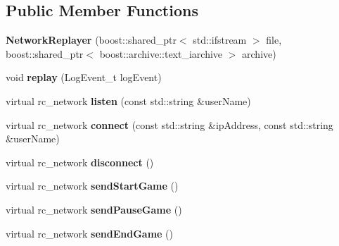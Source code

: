 \subsection*{Public Member Functions}
\begin{DoxyCompactItemize}
\item 
\hypertarget{classNetworkReplayer_ad91a8bed9fc2c9e69163c5290a823fee}{
{\bfseries NetworkReplayer} (boost::shared\_\-ptr$<$ std::ifstream $>$ file, boost::shared\_\-ptr$<$ boost::archive::text\_\-iarchive $>$ archive)}
\label{classNetworkReplayer_ad91a8bed9fc2c9e69163c5290a823fee}

\item 
\hypertarget{classNetworkReplayer_ab4162db2236a7b337bcef679682f8609}{
void {\bfseries replay} (LogEvent\_\-t logEvent)}
\label{classNetworkReplayer_ab4162db2236a7b337bcef679682f8609}

\item 
\hypertarget{classNetworkReplayer_a54f644fe92941370481c45989bad6615}{
virtual rc\_\-network {\bfseries listen} (const std::string \&userName)}
\label{classNetworkReplayer_a54f644fe92941370481c45989bad6615}

\item 
\hypertarget{classNetworkReplayer_a6d4deeeede0cd5c07b44489a33c113f5}{
virtual rc\_\-network {\bfseries connect} (const std::string \&ipAddress, const std::string \&userName)}
\label{classNetworkReplayer_a6d4deeeede0cd5c07b44489a33c113f5}

\item 
\hypertarget{classNetworkReplayer_a3aab774a33a87446aa874871fea54655}{
virtual rc\_\-network {\bfseries disconnect} ()}
\label{classNetworkReplayer_a3aab774a33a87446aa874871fea54655}

\item 
\hypertarget{classNetworkReplayer_aa9f70d4eee3d630c36c2bbc71bb7e195}{
virtual rc\_\-network {\bfseries sendStartGame} ()}
\label{classNetworkReplayer_aa9f70d4eee3d630c36c2bbc71bb7e195}

\item 
\hypertarget{classNetworkReplayer_aa54ba87a728ebdb0f23a82e409094468}{
virtual rc\_\-network {\bfseries sendPauseGame} ()}
\label{classNetworkReplayer_aa54ba87a728ebdb0f23a82e409094468}

\item 
\hypertarget{classNetworkReplayer_a33c840b356485101092fe220d4aa73fb}{
virtual rc\_\-network {\bfseries sendEndGame} ()}
\label{classNetworkReplayer_a33c840b356485101092fe220d4aa73fb}


\end{DoxyCompactItemize}
